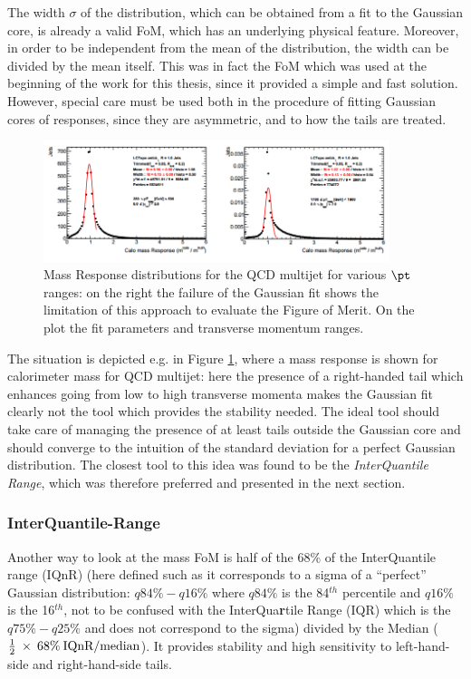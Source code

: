 The width $\sigma$ of the distribution, which can be obtained from a fit to the Gaussian core, is already a valid FoM, which has an underlying physical feature. Moreover, in order to be independent from the mean of the distribution, the width can be divided by the mean itself.
This was in fact the FoM which was used at the beginning of the work for this thesis, since it provided a simple and fast solution. However, special care must be used both in the procedure of fitting Gaussian cores of responses, since they are asymmetric, and to how the tails are treated.

\begin{figure}[!ht]
  \centering
      \includegraphics[width=0.9\textwidth]{jet_part/wrongsigma.png}
  \caption[Gaussian fit for QCD multijet]{Mass Response distributions for the QCD multijet for various $\pt$ ranges: on the right the failure of the Gaussian fit shows the limitation of this approach to evaluate the Figure of Merit. On the plot the fit parameters and transverse momentum ranges.}
  \label{fig:wrongsigma32}
\end{figure}

The situation is depicted e.g. in Figure \ref{fig:wrongsigma32}, where a mass response is shown for calorimeter mass for QCD multijet: here the presence of a right-handed tail which enhances going from low to high transverse momenta makes the Gaussian fit clearly not the tool which provides the stability needed. The ideal tool should take care of managing the presence of at least tails outside the Gaussian core and should converge to the intuition of the standard deviation for a perfect Gaussian distribution.
The closest tool to this idea was found to be the \textit{InterQuantile Range}, which was therefore preferred and presented in the next section.

\subsubsection{InterQuantile-Range}
Another way to look at the mass FoM is half of the 68\% of the InterQuantile range (IQnR) (here defined such as it corresponds to a sigma of a ``perfect'' Gaussian distribution: $q84\%-q16\%$ where $q84\%$ is the 84$^{th}$ percentile and $q16\%$ is the 16$^{th}$, not to be confused with the InterQua\textbf{r}tile Range (IQR) which is the $q75\%-q25\%$ and does not correspond to the sigma) divided by the Median ($\frac{1}{2}\: \times\: 68\% \:\textrm{IQnR/median}$). It provides stability and high sensitivity to left-hand-side and right-hand-side tails.

